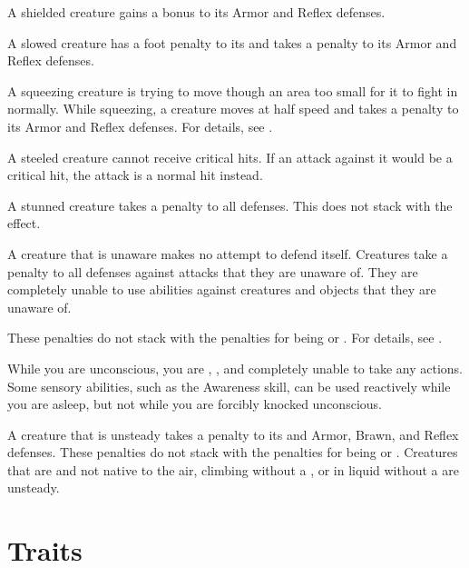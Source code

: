    A shielded creature gains a  bonus to its Armor and Reflex defenses.

   A slowed creature has a  foot penalty to its  and takes a  penalty to its Armor and Reflex defenses.

   A squeezing creature is trying to move though an area too small for it to fight in normally.
  While squeezing, a creature moves at half speed and takes a  penalty to its Armor and Reflex defenses.
  For details, see .

   A steeled creature cannot receive critical hits.
  If an attack against it would be a critical hit, the attack is a normal hit instead.

   A stunned creature takes a  penalty to all defenses.
  This does not stack with the \confused effect.

   A creature that is unaware makes no attempt to defend itself.
  Creatures take a  penalty to all defenses against attacks that they are unaware of.
  They are completely unable to use  abilities against creatures and objects that they are unaware of.

  These penalties do not stack with the penalties for being \partiallyunaware or \unsteady.
  For details, see .

   While you are unconscious, you are \helpless, \unaware, and completely unable to take any actions.
  Some sensory abilities, such as the Awareness skill, can be used reactively while you are asleep, but not while you are forcibly knocked unconscious.

   A creature that is unsteady takes a  penalty to its  and Armor, Brawn, and Reflex defenses.
  These penalties do not stack with the penalties for being \partiallyunaware or \unaware.
  Creatures that are  and not native to the air, climbing without a , or in liquid without a  are unsteady.

  \newpage
\section{Traits}\label{Traits}

